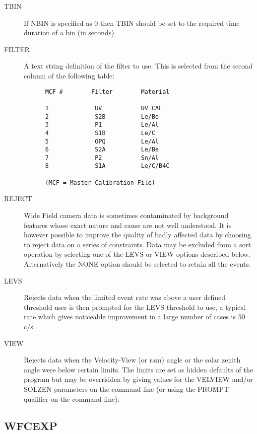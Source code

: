 \begin{description}
\item[TBIN]
If NBIN is specified as 0 then TBIN should be set to the required
time duration of a bin (in seconds).

\item[FILTER]
A text string definition of the filter to use. This is selected from
the second column of the following table:

\begin{verbatim}
      MCF #        Filter        Material

      1             UV           UV CAL
      2             S2B          Le/Be
      3             P1           Le/Al
      4             S1B          Le/C
      5             OPQ          Le/Al
      6             S2A          Le/Be
      7             P2           Sn/Al
      8             S1A          Le/C/B4C
 
      (MCF = Master Calibration File)
\end{verbatim}

\item[REJECT]
Wide Field camera data is sometimes contaminated by background features
whose exact nature and cause are not well understood. It is however
possible to improve the quality of badly affected data by choosing to
reject data on a series of constraints. Data may be excluded from a
sort operation by selecting one of the LEVS or VIEW options described
below. Alternatively the NONE option should be selected to retain all
the events.

\item[LEVS]
Rejects data when the limited event rate was above a user defined
threshold user is then prompted for the LEVS threshold to use, a typical
rate which gives noticeable improvement in a large number of cases is
50 c/s.

\item[VIEW]
Rejects data when the Velocity-View (or ram) angle or the solar zenith
angle were below certain limits. The limits are set as hidden defaults
of the program but may be overridden by giving values for the VELVIEW
and/or SOLZEN parameters on the command line (or using the PROMPT
qualifier on the command line).

\end{description}

\subsection{WFCEXP}
\label{sec:programs:wfcexp}

